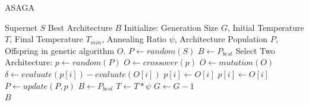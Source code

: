 \documentclass[a4paper,14pt]{extarticle}
\begin{document}
                \begin{algorithm}
                    \caption{
                        {\fontsize{12pt}{10pt}\selectfont
                            ASAGA
                        }
                        \label{alg:ASAGA}
                    }
                    {\fontsize{14pt}{13.5pt}\selectfont
                        \begin{algorithmic}[1htbp]
                            \Require Supernet $S$
                            \Ensure Best Architecture $B$
                            \State Initialize: Generation Size $G$, Initial Temperature $T$,
                            Final Temperature $T_{min}$, Annealing Ratio $\psi$, Architecture Population $P$,
                            Offspring in genetic algorithm $O$.
                            \State $P \gets random(S)$
                            \State $B \gets P_{best}$
                                    \State Select Two Architecture: $p \gets random(P)$
                                    \State $O \gets crossover(p)$
                                    \State $O \gets mutation(O)$
                                        \State $\delta \gets evaluate(p[i]) - evaluate(O[i])$
                                            \State $p[i] \gets O[i]$
                                            \State $p[i] \gets O[i]$
                                        \EndIf
                                    \EndFor
                                \State $P \gets update(P, p)$
                                \EndFor
                                \State $B \gets P_{best}$
                            \EndIf
                            \State $T \gets T*\psi$
                            \State $G \gets G - 1$
                            \EndWhile \\
                            \Return $B$
                        \end{algorithmic}
                    }
                \end{algorithm}
\end{document}
